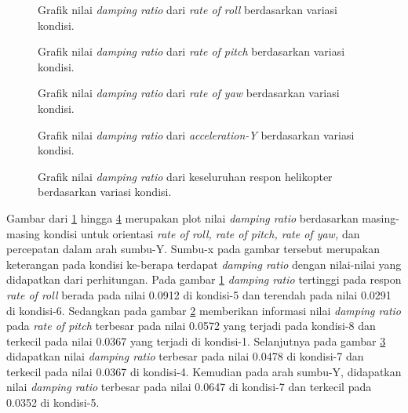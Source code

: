 \begin{figure}[h]
	\centering
	\caption{Grafik nilai \textit{damping ratio} dari \textit{rate of roll} berdasarkan variasi kondisi.}
	\label{fig:plot_ROR}
\end{figure}

\begin{figure}[H]
	\centering
	\caption{Grafik nilai \textit{damping ratio} dari \textit{rate of pitch} berdasarkan variasi kondisi.}
	\label{fig:plot_ROP}
\end{figure}

\begin{figure}[h]
	\centering
	\caption{Grafik nilai \textit{damping ratio} dari \textit{rate of yaw} berdasarkan variasi kondisi.}
	\label{fig:plot_ROY}
\end{figure}

\begin{figure}[h]
	\centering
	\caption{Grafik nilai \textit{damping ratio} dari \textit{acceleration-Y} berdasarkan variasi kondisi.}
	\label{fig:plot_Acc_Y}
\end{figure}

\begin{figure}[H]
	\centering
	\caption{Grafik nilai \textit{damping ratio} dari keseluruhan respon helikopter berdasarkan variasi kondisi.}
	\label{fig:plot_All}
\end{figure}

Gambar dari \ref{fig:plot_ROR} hingga \ref{fig:plot_Acc_Y} merupakan plot nilai \textit{damping ratio} berdasarkan masing-masing kondisi untuk orientasi \textit{rate of roll, rate of pitch, rate of yaw,} dan percepatan dalam arah sumbu-Y. Sumbu-x pada gambar tersebut merupakan keterangan pada kondisi ke-berapa terdapat \textit{damping ratio} dengan nilai-nilai yang didapatkan dari perhitungan. Pada gambar \ref{fig:plot_ROR} \textit{damping ratio} tertinggi pada respon \textit{rate of roll} berada pada nilai 0.0912 di kondisi-5 dan terendah pada nilai 0.0291 di kondisi-6. Sedangkan pada gambar \ref{fig:plot_ROP} memberikan informasi nilai \textit{damping ratio} pada \textit{rate of pitch} terbesar pada nilai 0.0572 yang terjadi pada kondisi-8 dan terkecil pada nilai 0.0367 yang terjadi di kondisi-1. Selanjutnya pada gambar \ref{fig:plot_ROY} didapatkan nilai \textit{damping ratio} terbesar pada nilai 0.0478 di kondisi-7 dan terkecil pada nilai 0.0367 di kondisi-4. Kemudian pada arah sumbu-Y, didapatkan nilai \textit{damping ratio} terbesar pada nilai 0.0647 di kondisi-7 dan terkecil pada 0.0352 di kondisi-5.  

